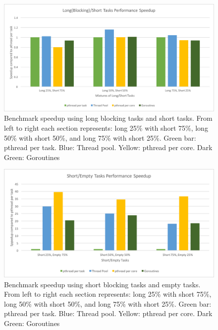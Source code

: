 \documentclass[journal, a4paper]{IEEEtran}
\begin{document}
\begin{figure}[!hbt]
		\begin{center}
		\includegraphics[width=\columnwidth]{test_1.png}
		\caption{Benchmark speedup using long blocking tasks and short tasks. From left to right each section represents: long 25\% with short 75\%, long 50\% with short 50\%, and long 75\% with short 25\%. Green bar: pthread per task. Blue: Thread pool. Yellow: pthread per core. Dark Green: Goroutines}
		\label{fig:tf_plot}
		\end{center}
	\end{figure}
	
	
\begin{figure}[!hbt]
		\begin{center}
		\includegraphics[width=\columnwidth]{test_2.png}
		\caption{Benchmark speedup using short blocking tasks and empty tasks. From left to right each section represents: long 25\% with short 75\%, long 50\% with short 50\%, and long 75\% with short 25\%. Green bar: pthread per task. Blue: Thread pool. Yellow: pthread per core. Dark Green: Goroutines}
		\label{fig:tf_plot}
		\end{center}
	\end{figure}
	
\end{document}
